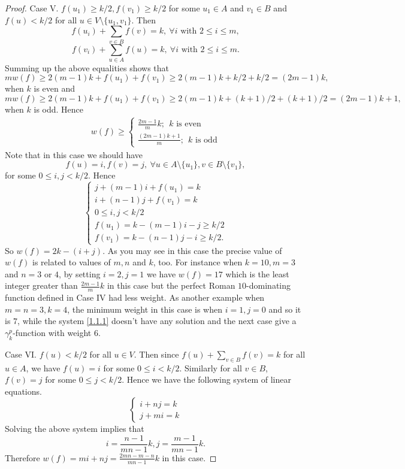 \documentclass[12pt]{amsart}
\begin{document}
\begin{proof}
Case V.  $f(u_1)\geq k/2, f(v_1)\geq k/2$ for some $u_1\in A$ and $v_1\in B$ and $f(u)<k/2$ for all $u\in V\setminus \{u_1,v_1\}$. Then 
$$f(u_i)+\sum_{v\in B}f(v)=k, \ \forall i \textrm{ with } 2\leq i \leq m,$$
$$f(v_i)+\sum_{u\in A}f(u)=k, \ \forall i \textrm{ with }  2\leq i \leq m.$$ 
Summing up the above equalities shows that
$$mw(f)\geq 2(m-1)k+f(u_1)+f(v_1)\geq 2(m-1)k+k/2+k/2=(2m-1)k,$$
when $k$ is even and 
$$mw(f)\geq 2(m-1)k+f(u_1)+f(v_1)\geq 2(m-1)k+(k+1)/2+(k+1)/2=(2m-1)k+1,$$
when $k$ is odd. Hence
\begin{align*}
w(f)\geq \left\lbrace\begin{array}{c}
\frac{2m-1}{m}k; \ \ k \textrm{ is even} \\ 
\frac{(2m-1)k+1}{m}; \ \ k \textrm{ is odd}
\end{array} \right.
\end{align*}
Note that in this case we should have 
$$f(u)=i, f(v)=j, \ \forall u \in A\setminus \{u_1\}, v\in B\setminus \{v_1\},$$
for some $0\leq i,j <k/2$. Hence 
\begin{equation}\label{1.2}
\left\lbrace \begin{array}{l}
j+(m-1)i+f(u_1)=k\\ 
i+(n-1)j+f(v_1)=k \\ 
0\leq i,j < k/2\\ 
 f(u_1)=k-(m-1)i-j\geq k/2\\
f(v_1)=k-(n-1)j-i\geq k/2.
\end{array}\right.
\end{equation}
So $w(f)=2k-(i+j)$. 
As you may see in this case the precise value of $w(f)$ is related to values of $m, n$ and $k$, too. For instance when $k=10, m=3$ and $n=3$ or $4$, by setting $i=2, j=1$ we have $w(f)=17$ which is the least integer greater than $\frac{2m-1}{m}k$ in this case but the perfect Roman $10$-dominating function defined in Case IV had less weight. As another example when $m=n=3, k=4$, the minimum weight in this case is when $i=1, j=0$ and so it is $7$, while the system \ref{1.1.1} doesn't have any solution and the next case give a $\gamma_k^p$-function with weight $6$. 

Case VI. $f(u)<k/2$ for all $u\in V$. Then since $f(u)+\sum_{v\in B}f(v)=k$ for all $u\in A$, we have $f(u)=i$ for some $0\leq i <k/2$. Similarly for all $v\in B$, $f(v)=j$ for some $0\leq j <k/2$. Hence we have the following system of linear equations.
\begin{equation}\label{1.3}
\left\lbrace \begin{array}{l}
i+nj=k \\ 
j+mi=k
\end{array}\right.
\end{equation}
Solving the above system implies that
$$i=\frac{n-1}{mn-1}k, j=\frac{m-1}{mn-1}k.$$
Therefore $w(f)=mi+nj=\frac{2mn-m-n}{mn-1}k$ in this case.


\end{proof}
\end{document}
